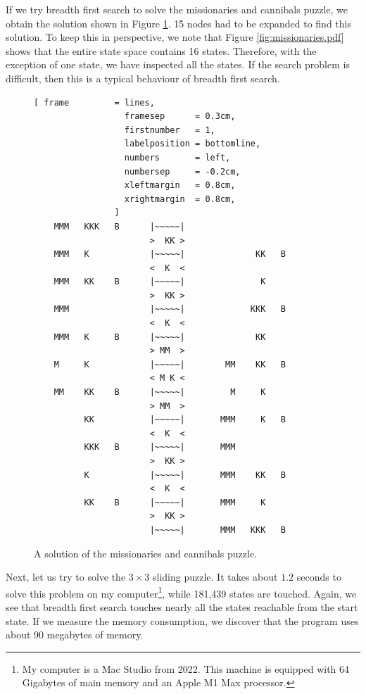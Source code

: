 If we try breadth first search to solve the missionaries and cannibals puzzle, we obtain
the solution shown in Figure \ref{fig:missionaries.solution}.  15 nodes had to be expanded to find
this solution.  To keep this in perspective, we note that Figure \ref{fig:missionaries.pdf} shows
that the entire state space contains 16 states.  Therefore, with the exception of one state, we have
inspected all the states.  If the search problem is difficult, then this is a typical behaviour of breadth
first search. 

\begin{figure}[!ht]
\centering
\begin{Verbatim}[ frame         = lines,
                  framesep      = 0.3cm,
                  firstnumber   = 1,
                  labelposition = bottomline,
                  numbers       = left,
                  numbersep     = -0.2cm,
                  xleftmargin   = 0.8cm,
                  xrightmargin  = 0.8cm,
                ]
    MMM   KKK   B      |~~~~~|
                       >  KK >
    MMM   K            |~~~~~|              KK   B
                       <  K  <
    MMM   KK    B      |~~~~~|               K
                       >  KK >
    MMM                |~~~~~|             KKK   B
                       <  K  <
    MMM   K     B      |~~~~~|              KK
                       > MM  >
    M     K            |~~~~~|        MM    KK   B
                       < M K <
    MM    KK    B      |~~~~~|         M     K
                       > MM  >
          KK           |~~~~~|       MMM     K   B
                       <  K  <
          KKK   B      |~~~~~|       MMM
                       >  KK >
          K            |~~~~~|       MMM    KK   B
                       <  K  <
          KK    B      |~~~~~|       MMM     K
                       >  KK >
                       |~~~~~|       MMM   KKK   B
\end{Verbatim}
\vspace*{-0.3cm}
\caption{A solution of the missionaries and cannibals puzzle.}
\label{fig:missionaries.solution}
\end{figure}

Next, let us try to solve the $3 \times 3$ sliding puzzle.  It takes about $1.2$ seconds to solve
this problem on my computer\footnote{
  My computer is a Mac Studio from 2022.  This machine is equipped with 64 Gigabytes of main memory and an
  Apple M1 Max processor.
}, while 181,439 states are touched.  
Again, we see that breadth first search touches nearly all the states reachable from the start state.
If we measure the memory consumption, we discover that the program uses about 90 megabytes of memory.

